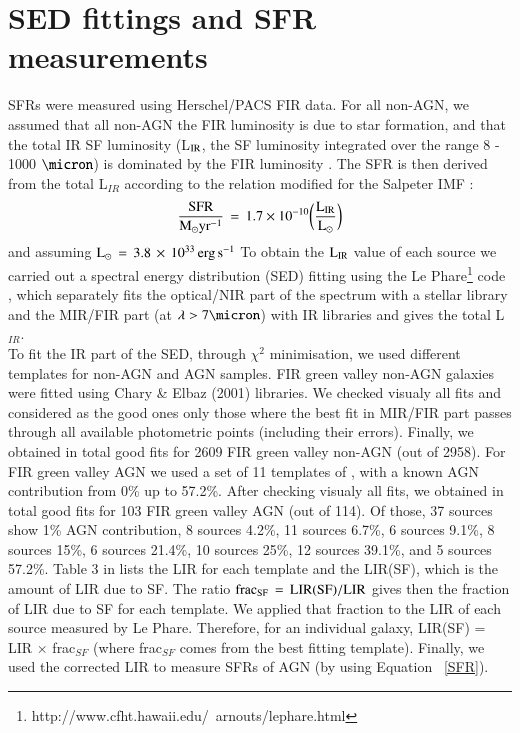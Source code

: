 \documentclass[fleqn,usenatbib]{mnras}
\begin{document}
\section{SED fittings and SFR measurements}

SFRs were measured using Herschel/PACS FIR data. For all non-AGN, we assumed that all non-AGN the FIR luminosity is due to star formation, and that the total IR SF luminosity (L$\rm{_{IR}}$, the SF luminosity integrated over the range 8 - 1000 $\micron$) is dominated by the FIR luminosity \citep{povic2016}. The SFR is then derived from the total L$_{IR}$ according to the \citet{Kennicutt} relation modified for the Salpeter IMF \citep{Salpeter1955}:
\begin{equation}
\rm{\frac{SFR}{M_{\odot}yr^{-1}}\,=\,1.7\times 10^{-10}\bigg(\frac{L_{IR}}{L_{\odot}}\bigg)}
\label{SFR}
\end{equation}
and assuming $\rm{L_{\odot}\,=\,3.8\,\times\,10^{33}\,erg\,s^{-1}}$
To obtain the $\rm{L_{IR}}$ value of each source we carried out a spectral energy distribution (SED) fitting using the Le Phare\footnote{http://www.cfht.hawaii.edu/~arnouts/lephare.html} code \citep{Arnouts, Ilbert}, which separately fits the optical/NIR part of the spectrum with a stellar library and the MIR/FIR part (at $\rm{\lambda>7\micron}$) with IR libraries and gives the total L$_{IR}$. \\
\indent To fit the IR part of the SED, through $\chi^2$ minimisation, we used different templates for non-AGN and AGN samples. FIR green valley non-AGN galaxies were fitted using Chary \& Elbaz (2001) libraries. We checked visualy all fits and considered as the good ones only those where the best fit in MIR/FIR part passes through all available photometric points (including their errors). Finally, we obtained in total good fits for 2609 FIR green valley non-AGN (out of 2958). For FIR green valley AGN we used a set of 11 templates of \citet{Kirkpatrick2015}, with a known AGN contribution from 0\% up to 57.2\%. After checking visualy all fits, we obtained in total good fits for 103 FIR green valley AGN (out of 114). Of those, 37 sources show 1\% AGN contribution, 8 sources 4.2\%, 11 sources 6.7\%, 6 sources 9.1\%, 8 sources 15\%, 6 sources 21.4\%, 10 sources 25\%, 12 sources 39.1\%, and 5 sources 57.2\%. Table 3 in \citet{Kirkpatrick2015} lists the LIR for each template and the LIR(SF), which is the amount of LIR due to SF. The ratio $\rm{frac_{SF}\,=\,LIR(SF)/LIR}$ gives then the fraction of LIR due to SF for each template. We applied that fraction to the LIR of each source measured by Le Phare. Therefore, for an individual galaxy, LIR(SF) = LIR $\times$ frac$_{SF}$ (where frac$_{SF}$ comes from the best fitting template). Finally, we used the corrected LIR to measure SFRs of AGN (by using Equation ~\ref{SFR}).
\end{document}
